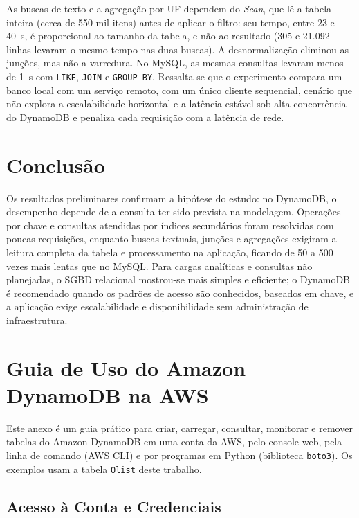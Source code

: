 \documentclass[12pt]{article}
\begin{document}
As buscas de texto e a agregação por UF dependem do \textit{Scan}, que lê a
tabela inteira (cerca de 550 mil itens) antes de aplicar o filtro: seu tempo,
entre 23 e 40~s, é proporcional ao tamanho da tabela, e não ao resultado
(305 e 21.092 linhas levaram o mesmo tempo nas duas buscas). A
desnormalização eliminou as junções, mas não a varredura. No MySQL, as mesmas
consultas levaram menos de 1~s com \texttt{LIKE}, \texttt{JOIN} e
\texttt{GROUP BY}. Ressalta-se que o experimento compara um banco local com um
serviço remoto, com um único cliente sequencial, cenário que não explora a
escalabilidade horizontal e a latência estável sob alta concorrência do
DynamoDB e penaliza cada requisição com a latência de rede.

\section{Conclusão}

Os resultados preliminares confirmam a hipótese do estudo: no DynamoDB, o
desempenho depende de a consulta ter sido prevista na modelagem. Operações por
chave e consultas atendidas por índices secundários foram resolvidas com poucas
requisições, enquanto buscas textuais, junções e agregações exigiram a leitura
completa da tabela e processamento na aplicação, ficando de 50 a 500 vezes mais
lentas que no MySQL. Para cargas analíticas e consultas não planejadas, o SGBD
relacional mostrou-se mais simples e eficiente; o DynamoDB é recomendado quando
os padrões de acesso são conhecidos, baseados em chave, e a aplicação exige
escalabilidade e disponibilidade sem administração de infraestrutura.




\newpage
\appendix
\section{Guia de Uso do Amazon DynamoDB na AWS}
\label{anexo:guia}

Este anexo é um guia prático para criar, carregar, consultar, monitorar e
remover tabelas do Amazon DynamoDB em uma conta da AWS, pelo console web, pela
linha de comando (AWS CLI) e por programas em Python (biblioteca
\texttt{boto3}). Os exemplos usam a tabela \texttt{Olist} deste trabalho.

\subsection{Acesso à Conta e Credenciais}
\end{document}
